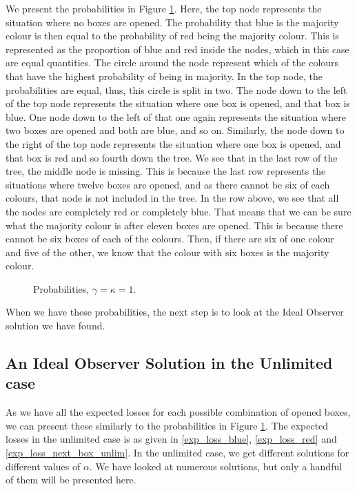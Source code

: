 We present the probabilities in Figure \ref{fig:probability_gamma_kappa_1}. Here, the top node represents the situation where no boxes are opened. The probability that blue is the majority colour is then equal to the probability of red being the majority colour. This is represented as the proportion of blue and red inside the nodes, which in this case are equal quantities. The circle around the node represent which of the colours that have the highest probability of being in majority. In the top node, the probabilities are equal, thus, this circle is split in two. The node down to the left of the top node represents the situation where one box is opened, and that box is blue. One node down to the left of that one again represents the situation where two boxes are opened and both are blue, and so on. Similarly, the node down to the right of the top node represents the situation where one box is opened, and that box is red and so fourth down the tree. We see that in the last row of the tree, the middle node is missing. This is because the last row represents the situations where twelve boxes are opened, and as there cannot be six of each colours, that node is not included in the tree. In the row above, we see that all the nodes are completely red or completely blue. That means that we can be sure what the majority colour is after eleven boxes are opened. This is because there cannot be six boxes of each of the colours. Then, if there are six of one colour and five of the other, we know that the colour with six boxes is the majority colour. 
\begin{figure}
    \centering
    \scalebox{0.4}{}
    \caption[Probabilities, majority colour. $\gamma=\kappa=1$]{Probabilities, $\gamma=\kappa =1$.}
    \label{fig:probability_gamma_kappa_1}
\end{figure}



When we have these probabilities, the next step is to look at the Ideal Observer solution we have found.




\subsection{An Ideal Observer Solution in the Unlimited case}

As we have all the expected losses for each possible combination of opened boxes, we can present these similarly to the probabilities in Figure \ref{fig:probability_gamma_kappa_1}. 
The expected losses in the unlimited case is as given in \eqref{exp_loss_blue}, \eqref{exp_loss_red} and \eqref{exp_loss_next_box_unlim}. In the unlimited case, we get different solutions for different values of $\alpha$. We have looked at numerous solutions, but only a handful of them will be presented here. 

